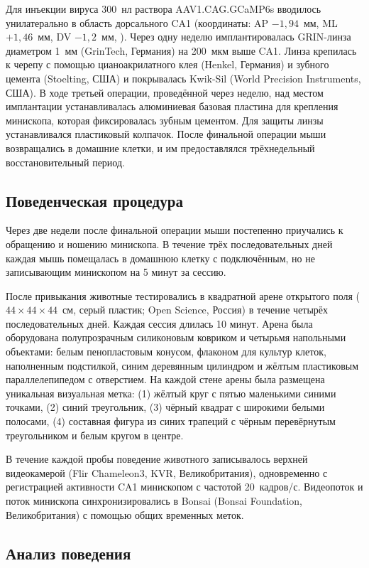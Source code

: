 Для инъекции вируса 300~нл раствора AAV1.CAG.GCaMP6s вводилось унилатерально в область дорсального CA1 (координаты: AP $-1{,}94$~мм, ML $+1{,}46$~мм, DV $-1{,}2$~мм, \cite{Paxinos2019}). Через одну неделю имплантировалась GRIN-линза диаметром 1~мм (GrinTech, Германия) на 200~мкм выше CA1. Линза крепилась к черепу с помощью цианоакрилатного клея (Henkel, Германия) и зубного цемента (Stoelting, США) и покрывалась Kwik-Sil (World Precision Instruments, США). В ходе третьей операции, проведённой через неделю, над местом имплантации устанавливалась алюминиевая базовая пластина для крепления минископа, которая фиксировалась зубным цементом. Для защиты линзы устанавливался пластиковый колпачок. После финальной операции мыши возвращались в домашние клетки, и им предоставлялся трёхнедельный восстановительный период.

\subsection{Поведенческая процедура}

Через две недели после финальной операции мыши постепенно приучались к обращению и ношению минископа. В течение трёх последовательных дней каждая мышь помещалась в домашнюю клетку с подключённым, но не записывающим минископом на 5 минут за сессию.

После привыкания животные тестировались в квадратной арене открытого поля ($44 \times 44 \times 44$~см, серый пластик; Open Science, Россия) в течение четырёх последовательных дней. Каждая сессия длилась 10 минут. Арена была оборудована полупрозрачным силиконовым ковриком и четырьмя напольными объектами: белым пенопластовым конусом, флаконом для культур клеток, наполненным подстилкой, синим деревянным цилиндром и жёлтым пластиковым параллелепипедом с отверстием. На каждой стене арены была размещена уникальная визуальная метка: (1) жёлтый круг с пятью маленькими синими точками, (2) синий треугольник, (3) чёрный квадрат с широкими белыми полосами, (4) составная фигура из синих трапеций с чёрным перевёрнутым треугольником и белым кругом в центре.

В течение каждой пробы поведение животного записывалось верхней видеокамерой (Flir Chameleon3, KVR, Великобритания), одновременно с регистрацией активности CA1 минископом с частотой 20~кадров/с. Видеопоток и поток минископа синхронизировались в Bonsai (Bonsai Foundation, Великобритания) с помощью общих временных меток.

\subsection{Анализ поведения}

